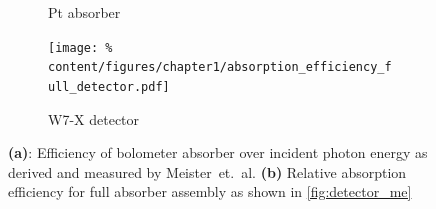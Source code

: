             \begin{figure}[t]%
                \centering%
                \begin{subfigure}{0.53\textwidth}%
                    \caption{Pt absorber\cite{Meister2013}}\label{fig:pt_absorber}%
                \end{subfigure}%
                \hspace*{0.75cm}%
                \begin{subfigure}{0.375\textwidth}%
                    \texttt{[image: \%
                        content/figures/chapter1/absorption\_efficiency\_full\_detector.pdf]}%
                    \caption{W7-X detector\cite{Zhang2024}}\label{fig:absorp_effic}%
                \end{subfigure}%
                \caption{\textbf{(a)}: Efficiency of bolometer absorber over incident photon energy as derived and measured by Meister~et.~al\cite{Meister2013}. \textbf{(b)} Relative absorption efficiency for full absorber assembly as shown in \cref{fig:detector_me}}\label{fig:sensitivity_meister}%
            \end{figure}%
%
